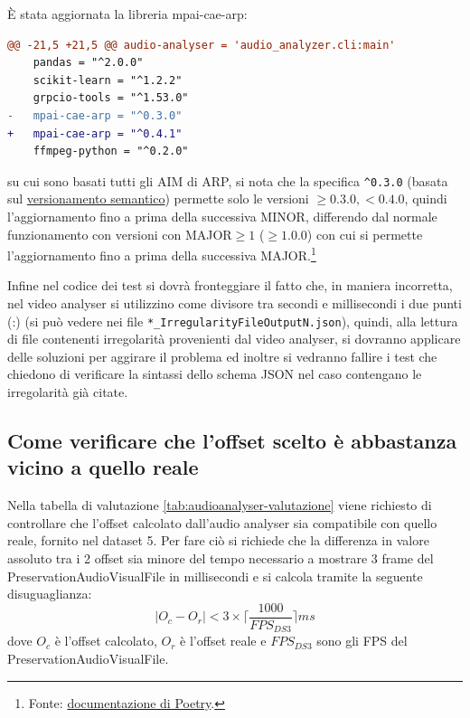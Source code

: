È stata aggiornata la libreria mpai-cae-arp:
\begin{lstlisting}[language=diff]
@@ -21,5 +21,5 @@ audio-analyser = 'audio_analyzer.cli:main'
    pandas = "^2.0.0"
    scikit-learn = "^1.2.2"
    grpcio-tools = "^1.53.0"
-   mpai-cae-arp = "^0.3.0"
+   mpai-cae-arp = "^0.4.1"
    ffmpeg-python = "^0.2.0"
\end{lstlisting}
su cui sono basati tutti gli \ac{AIM} di \ac{ARP}, si nota che la specifica \verb|^0.3.0| (basata sul \href{https://semver.org/lang/it/}{versionamento semantico}) permette solo le versioni $\ge0.3.0, <0.4.0$, quindi l'aggiornamento fino a prima della successiva MINOR, differendo dal normale funzionamento con versioni con MAJOR$\ge1$ ($\ge1.0.0$) con cui si permette l'aggiornamento fino a prima della successiva MAJOR.\footnote{Fonte: \href{https://python-poetry.org/docs/dependency-specification/#caret-requirements}{documentazione di Poetry}.}

Infine nel codice dei test si dovrà fronteggiare il fatto che, in maniera incorretta, nel video analyser si utilizzino come divisore tra secondi e millisecondi i due punti (:) (si può vedere nei file \verb|*_IrregularityFileOutputN.json|), quindi, alla lettura di file contenenti irregolarità provenienti dal video analyser, si dovranno applicare delle soluzioni per aggirare il problema ed inoltre si vedranno fallire i test che chiedono di verificare la sintassi dello schema JSON nel caso contengano le irregolarità già citate.


\subsection{Come verificare che l'offset scelto è abbastanza vicino a quello reale} \label{ssec:audioanalyser-offset}   %
Nella tabella di valutazione \ref{tab:audioanalyser-valutazione} viene richiesto di controllare che l'offset calcolato dall'audio analyser sia compatibile con quello reale, fornito nel dataset 5.
Per fare ciò si richiede che la differenza in valore assoluto tra i 2 offset sia minore del tempo necessario a mostrare 3 frame del PreservationAudioVisualFile in millisecondi e si calcola tramite la seguente disuguaglianza:
\begin{equation}
    |O_c - O_r| < 3 \times \lceil\frac{1000}{FPS_{DS3}}\rceil ms
\end{equation}
dove $O_c$ è l'offset calcolato, $O_r$ è l'offset reale e $FPS_{DS3}$ sono gli FPS del PreservationAudioVisualFile.

